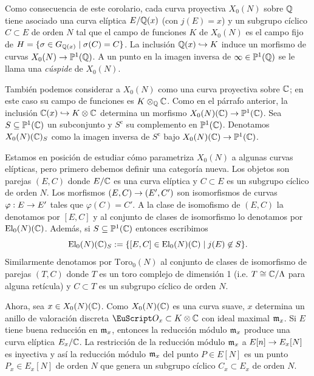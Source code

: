 \documentclass[../../tesis_maestria]{subfiles}
\begin{document}
Como consecuencia de este corolario, cada curva proyectiva $X_0(N)$ sobre $\mathbb{Q}$ tiene asociado una
curva el\'iptica $E/\mathbb{Q}(x)$ (con $j(E)=x$) y un subgrupo c\'iclico $C\subset E$ de orden $N$ tal que
el campo de funciones $K$ de $X_0(N)$ es el campo fijo de $H=\{\sigma\in G_{\mathbb{Q}(x)}\mid \sigma(C)=C\}$.
La inclusi\'on $\mathbb{Q}(x)\hookrightarrow K$ induce un morfismo de curvas $X_0(N)\rightarrow\mathbb{P}^1(\mathbb{Q})$. 
A un punto en la imagen inversa de $\infty\in\mathbb{P}^1(\mathbb{Q})$ se le llama una \emph{c\'uspide} de
$X_0(N)$.

Tambi\'en podemos considerar a $X_0(N)$ como una curva proyectiva sobre $\mathbb{C}$; en este caso su
campo de funciones es $K\otimes_{\mathbb{Q}}\mathbb{C}$. Como en el p\'arrafo anterior, la inclusi\'on
$\mathbb{C}(x)\hookrightarrow K\otimes\mathbb{C}$  determina un morfismo $X_0(N)(\mathbb{C})\rightarrow\mathbb{P}^1(\mathbb{C})$. Sea
$S\subseteq\mathbb{P}^1(\mathbb{C})$ un subconjunto y $S^{\text{c}}$ su complemento en $\mathbb{P}^1(\mathbb{C})$. Denotamos
$X_0(N)(\mathbb{C})_S$ como la imagen inversa de $S^{\text{c}}$ bajo $X_0(N)(\mathbb{C})\rightarrow\mathbb{P}^1(\mathbb{C})$.

Estamos en posici\'on de estudiar c\'omo parametriza $X_0(N)$ a algunas curvas el\'ipticas, pero
primero debemos definir una categor\'ia nueva. Los objetos son parejas $(E,C)$ donde $E/\mathbb{C}$ es
una curva el\'iptica y $C\subset E$ es un subgrupo c\'iclico de orden $N$. Los morfismos
$(E,C)\rightarrow(E',C')$ son isomorfismos de curvas $\varphi:E\rightarrow E'$ tales que $\varphi(C)=C'$. A la
clase de isomofismo de $(E,C)$ la denotamos por $[E,C]$ y al conjunto de clases de isomorfismo
lo denotamos por $\text{El}_0(N)(\mathbb{C})$. Adem\'as, si $S\subseteq\mathbb{P}^1(\mathbb{C})$ entonces escribimos
\[
  \text{El}_0(N)(\mathbb{C})_S:=\{[E,C]\in\mathrm{El}_0(N)(\mathbb{C})\mid j(E)\not\in S\}.
\]
Similarmente denotamos por $\mathrm{Toro}_0(N)$ al conjunto de clases de isomorfismo de parejas
$(T,C)$ donde $T$ es un toro complejo de dimensi\'on 1 (i.e. $T\cong\mathbb{C}/\Lambda$ para alguna ret\'icula)
y $C\subset T$ es un subgrupo c\'iclico de orden $N$.


Ahora, sea $x\in X_0(N)(\mathbb{C})$. Como $X_0(N)(\mathbb{C})$ es una curva suave, $x$ determina un anillo de
valoraci\'on discreta $\Oo_x\subset K\otimes\CC$ con ideal maximal $\mathfrak{m}_x$. Si $E$ tiene buena
reducci\'on en $\mathfrak{m}_x$, entonces la reducci\'on m\'odulo $\mathfrak{m}_x$ produce una curva el\'iptica
$E_x/\mathbb{C}$. La restricci\'on de la reducci\'on m\'odulo $\mathfrak{m}_x$ a $E[n]\rightarrow E_x[N]$ es inyectiva y
as\'i la reducci\'on m\'odulo $\mathfrak{m}_x$ del punto $P\in E[N]$ es un punto $P_x\in E_x[N]$ de orden
$N$ que genera un subgrupo c\'iclico $C_x\subset E_x$ de orden $N$.
\end{document}
